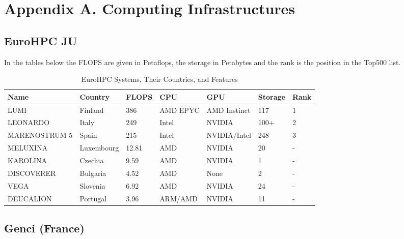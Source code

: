 
\clearpage
\appendix
\section*{Appendix A. Computing Infrastructures}
\label{sec:app:architectures}


\subsection*{EuroHPC JU}
\label{sec:arch:eurohpc-ju}

In the tables below the FLOPS are given in Petaflops, the storage in Petabytes and the rank is the position in the Top500 list.

\begin{table}[h!]
    \centering
    \begin{tabular}{l l l l l l l}
    \toprule
    \textbf{Name} & \textbf{Country} & \textbf{FLOPS} & \textbf{CPU} & \textbf{GPU} & \textbf{Storage} & \textbf{Rank} \\
    \midrule
    LUMI & Finland & 386 & AMD EPYC & AMD Instinct & 117 & 1 \\
    LEONARDO & Italy & 249 & Intel & NVIDIA & 100+ & 2 \\
    MARENOSTRUM 5 & Spain & 215 & Intel & NVIDIA/Intel & 248 & 3 \\
    MELUXINA & Luxembourg & 12.81 & AMD & NVIDIA & 20 & - \\
    KAROLINA & Czechia & 9.59 & AMD & NVIDIA & 1 & - \\
    DISCOVERER & Bulgaria & 4.52 & AMD & None & 2 & - \\
    VEGA & Slovenia & 6.92 & AMD & NVIDIA & 24 & - \\
    DEUCALION & Portugal & 3.96 & ARM/AMD & NVIDIA & 11 & - \\
    \bottomrule
    \end{tabular}
    \caption{EuroHPC Systems, Their Countries, and Features}
    \end{table}

    \subsection*{Genci (France)}
\label{sec:arch:gaya}

